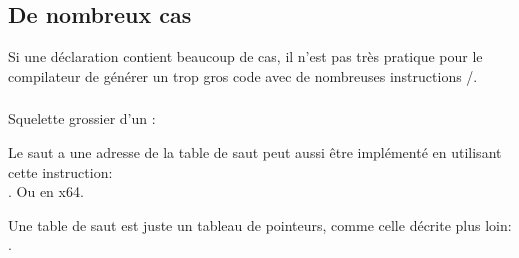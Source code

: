 \subsection{De nombreux cas}

Si une déclaration  contient beaucoup de cas, il n'est pas très pratique
pour le compilateur de générer un trop gros code avec de nombreuses instructions
\JE/\JNE.







\subsubsection{\Conclusion{}}

Squelette grossier d'un :



Le saut a une adresse de la table de saut peut aussi être implémenté en utilisant
cette instruction: \\
.
Ou  en x64.

Une table de saut est juste un tableau de pointeurs, comme celle décrite plus
loin: . 
